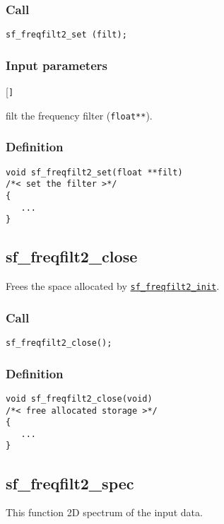 \subsubsection*{Call}
\begin{verbatim}sf_freqfilt2_set (filt);\end{verbatim}

\subsubsection*{Input parameters}
\begin{desclist}{\tt }{\quad}[\tt ]
   \setlength\itemsep{0pt}
   \item[filt] the frequency filter (\texttt{float**}).  
\end{desclist}

\subsubsection*{Definition}
\begin{verbatim}
void sf_freqfilt2_set(float **filt)
/*< set the filter >*/
{
   ...
}
\end{verbatim}




\subsection{{sf\_freqfilt2\_close}}
Frees the space allocated by \hyperref[sec:sf_freqfilt2_init]{\texttt{sf\_freqfilt2\_init}}.

\subsubsection*{Call}
\begin{verbatim}sf_freqfilt2_close();\end{verbatim}

\subsubsection*{Definition}
\begin{verbatim}
void sf_freqfilt2_close(void) 
/*< free allocated storage >*/
{
   ...
}
\end{verbatim}




\subsection{{sf\_freqfilt2\_spec}}
This function 2D spectrum of the input data.

